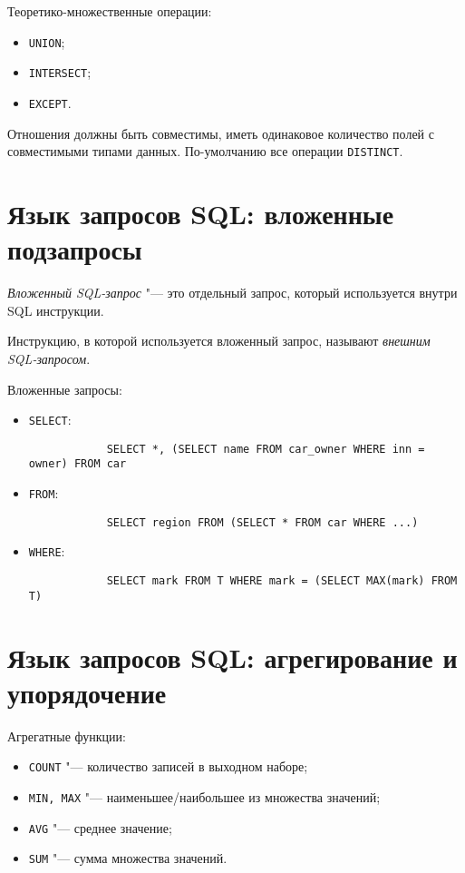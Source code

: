 Теоретико-множественные операции:
\begin{itemize}
	\item \texttt{UNION};
	\item \texttt{INTERSECT};
	\item \texttt{EXCEPT}.
\end{itemize}
Отношения должны быть совместимы, \ie иметь одинаковое количество полей с совместимыми типами данных.
По-умолчанию все операции \texttt{DISTINCT}.

\section{Язык запросов SQL: вложенные подзапросы}

\begin{definition}
	\emph{Вложенный SQL-запрос} "--- это отдельный запрос, который используется внутри SQL инструкции.

	Инструкцию, в которой используется вложенный запрос, называют \emph{внешним SQL-запросом}.
\end{definition}

Вложенные запросы:
\begin{itemize}
	\item \texttt{SELECT}:
		\begin{verbatim}
			SELECT *, (SELECT name FROM car_owner WHERE inn = owner) FROM car
		\end{verbatim}
	\item \texttt{FROM}:
		\begin{verbatim}
			SELECT region FROM (SELECT * FROM car WHERE ...)
		\end{verbatim}
	\item \texttt{WHERE}:
		\begin{verbatim}
			SELECT mark FROM T WHERE mark = (SELECT MAX(mark) FROM T)
		\end{verbatim}
\end{itemize}

\section{Язык запросов SQL: агрегирование и упорядочение}

Агрегатные функции:
\begin{itemize}
	\item \texttt{COUNT} "--- количество записей в выходном наборе;
	\item \texttt{MIN, MAX} "--- наименьшее/наибольшее из множества значений;
	\item \texttt{AVG} "--- среднее значение;
	\item \texttt{SUM} "--- сумма множества значений.
\end{itemize}

